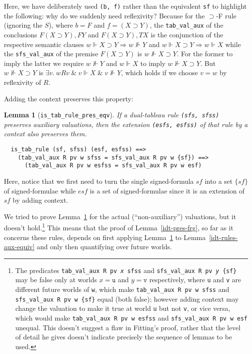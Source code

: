 \documentclass[a4paper]{article}
\newtheorem{lemma}{Lemma}
\begin{document}
Here, we have deliberately used \texttt{(b, f)} rather than the
equivalent \texttt{sf} to highlight the following: why do we suddenly
need reflexivity?  
Because for the $\supset$-F
rule (ignoring the $S$), where $b=F$ and $f = (X \supset Y)$, the
\texttt{tab\_val\_aux} of the conclusions $F (X \supset Y), F Y$
and $F (X \supset Y), T X$ is the conjunction of the respective
semantic clauses $w \Vdash X \supset Y \Rightarrow w \not\Vdash Y$ and
$w \Vdash X \supset Y \Rightarrow w \Vdash X$ while the
\texttt{sfs\_val\_aux} of the premise $F (X \supset Y)$ is
$w \not\Vdash X \supset Y$.  For the former to imply the latter we
require $w \not\Vdash Y$ and $w \Vdash X$ to imply
$w \not\Vdash X \supset Y$.  But $w \not\Vdash X \supset Y$ is
$\exists v.\ w R v \;\&\; v \Vdash X \;\&\; v \not\Vdash Y$, which
holds if we choose $v=w$ by reflexivity of $R$.

Adding the context preserves this property:
\begin{lemma}[\texttt{is\_tab\_rule\_pres\_eqv}] \label{is-tab-rule-pres-eqv}
If a dual-tableau rule \texttt{(sfs, sfss)} 
preserves auxiliary valuations,
then the extension \texttt{(esfs, esfss)} of that rule 
by a context also preserves them.
\end{lemma}
\begin{verbatim}
  is_tab_rule (sf, sfss) (esf, esfss) ==>
    (tab_val_aux R pv w sfss = sfs_val_aux R pv w {sf}) ==>
      (tab_val_aux R pv w esfss = sfs_val_aux R pv w esf)
\end{verbatim}

Here, notice that we first need to turn the single signed-formula $sf$
into a set $\{sf\}$ of signed-formulae while $esf$ is a set of
signed-formulae since it is an extension of $sf$ by adding context.

We tried to prove Lemma~\ref{is-tab-rule-pres-eqv}
for the actual (``non-auxiliary'') valuations,
but it doesn't hold.\footnote{
The predicates \texttt{tab\_val\_aux R pv \textit{x} sfss} and 
\texttt{sfs\_val\_aux R pv \textit{y} \{sf\}} 
may be false only at worlds $x = \texttt{u}$ and $y = \texttt{v}$ 
respectively, where \texttt{u} and \texttt{v}
are different future worlds of \texttt{w},
which make
\texttt{tab\_val\_aux R pv w sfss} and \texttt{sfs\_val\_aux R pv w \{sf\}}
equal (both false);
however adding context may change the valuation to make it true
at world \texttt{u} but not \texttt{v}, or vice versa,
which would make 
\texttt{tab\_val\_aux R pv w esfss} and \texttt{sfs\_val\_aux R pv w esf}
unequal.
This doesn't suggest a flaw in Fitting's proof, rather that the level of detail
he gives doesn't indicate precisely the sequence of lemmas to be used.}
This means that the proof of Lemma~\ref{idt-pres-frg}, 
so far as it concerns these rules, depends on first applying 
Lemma~\ref{is-tab-rule-pres-eqv} to Lemma~\ref{idt-rules-aux-equiv}
and only then quantifying over future worlds.  
\end{document}

